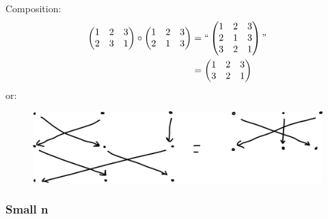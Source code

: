 \begin{example}
  Composition:
\begin{align*}
    \begin{pmatrix}
    1 & 2 & 3 \\
    2 & 3 & 1
    \end{pmatrix} \circ
    \begin{pmatrix}
    1 & 2 & 3 \\
    2 & 1 & 3
    \end{pmatrix}
    &= ``\begin{pmatrix}
    1 & 2 & 3 \\
    2 & 1 & 3 \\
    3 & 2 & 1
    \end{pmatrix}" \\
    &= \begin{pmatrix}
        1 & 2 & 3 \\
        3 & 2 & 1
    \end{pmatrix}
\end{align*}
or:

\begin{figure}
{\centering \includegraphics{figures/02-symmetric-graphical} }
\end{figure}
\end{example} 

\hypertarget{small-n}{%
\subsubsection{Small n}\label{small-n}}

